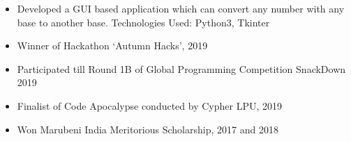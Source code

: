 \documentclass[10pt,a4paper,ragged2e]{altacv}
\begin{document}
\begin{itemize}
\item
Developed a GUI based application which can convert any number with any base to another base.\newline
Technologies Used: Python3, Tkinter

\end{itemize}
\divider











\begin{itemize}
\item\linespread{1.2} \large Winner of Hackathon ‘Autumn Hacks’, 2019
\item  Participated till Round 1B of Global Programming
Competition SnackDown 2019
\item Finalist of Code Apocalypse conducted by Cypher LPU, 2019
\item Won Marubeni India Meritorious Scholarship, 2017 and 2018

\end{itemize}
\clearpage
\end{document}

